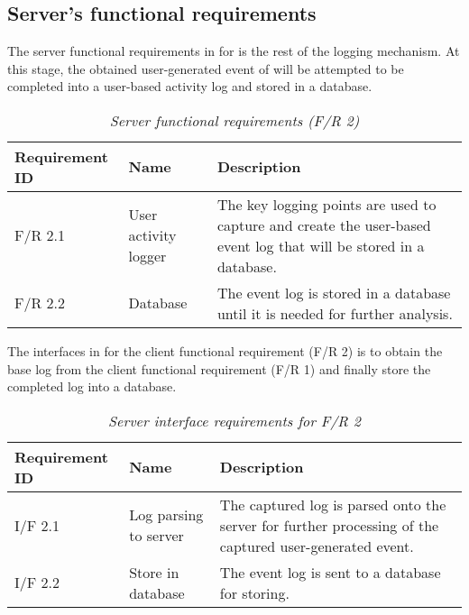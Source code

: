 \subsection{Server's functional requirements}
The server functional requirements in  for  is the rest of the logging mechanism. At this stage, the obtained user-generated event of  will be attempted to be completed into a user-based activity log and stored in a database.

\begin{table}[!htb]
	\centering
	\small
	\caption[Server functional requirements]
	{\textit{Server functional requirements (F/R 2)}}
	\label{tbl:Ch2_Server_Functional_Requirements}
	\begin{tabularx}{\textwidth}{|l|l|X|}
		\hline \textbf{Requirement ID} & \textbf{Name} & \textbf{Description} \\
		\hline F/R 2.1 & User activity logger & The key logging points are used to capture and create the user-based event log that will be stored in a database.\\
		\hline F/R 2.2 & Database & The event log is stored in a database until it is needed for further analysis.\\
		\hline
	\end{tabularx}
\end{table}

The interfaces in  for the client functional requirement (F/R 2) is to obtain the base log from the client functional requirement (F/R 1) and finally store the completed log into a database.

\begin{table}[!htb]
	\centering
	\small
	\caption[Server interface requirements]
	{\textit{Server interface requirements for F/R 2}}
	\label{tbl:ch2:serverInterfaceRequirements}
	\begin{tabularx}{\textwidth}{|l|l|X|}
		\hline \textbf{Requirement ID} & \textbf{Name} & \textbf{Description} \\
		\hline I/F 2.1 & Log parsing to server & The captured log is parsed onto the server for further processing of the captured user-generated event.\\
		\hline I/F 2.2 & Store in database & The event log is sent to a database for storing.\\
		\hline
	\end{tabularx}
\end{table}

